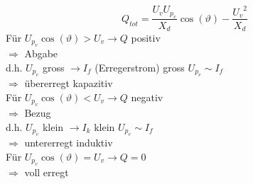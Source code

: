 \documentclass[a4,paper,fleqn]{article}
\begin{document}
\[ \boxed{Q_{tot} = \frac{U_v U_{p_v}}{X_d} \cos(\vartheta) - \frac{{U_v}^2}{X_d}} \]
Für $U_{p_v} \cos(\vartheta) > U_v \to Q $ positiv \\
$\Rightarrow$ Abgabe \\
d.h. $U_{p_v}$ gross $\to I_f$ (Erregerstrom) gross
$U_{p_v} \sim I_f$ \\
$\Rightarrow$ übererregt kapazitiv \\
Für $U_{p_v} \cos(\vartheta) < U_v \to Q $ negativ \\
$\Rightarrow$ Bezug \\
d.h. $U_{p_v}$ klein $\to I_k$ klein
$U_{p_v} \sim I_f$ \\
$\Rightarrow$ untererregt induktiv\\
Für $U_{p_v} \cos(\vartheta) = U_v \to Q = 0$ \\
$\Rightarrow$ voll erregt\\
\end{document}
